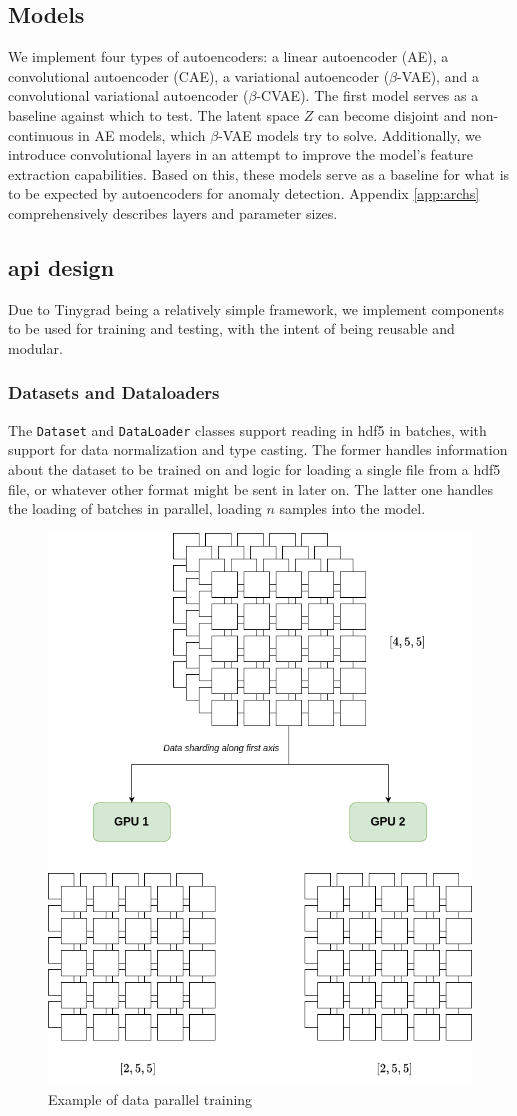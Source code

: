 \subsection{Models} 

We implement four types of autoencoders: a linear autoencoder (AE), a convolutional autoencoder (CAE), a variational autoencoder ($\beta$-VAE), and a convolutional variational autoencoder ($\beta$-CVAE). The first model serves as a baseline against which to test. The latent space $Z$ can become disjoint and non-continuous in AE models, which $\beta$-VAE models try to solve. Additionally, we introduce convolutional layers in an attempt to improve the model's feature extraction capabilities. Based on this, these models serve as a baseline for what is to be expected by autoencoders for anomaly detection. Appendix \ref{app:archs} comprehensively describes layers and parameter sizes. \\

\subsection{\acrshort{api} design}

Due to Tinygrad being a relatively simple framework, we implement components to be used for training and testing, with the intent of being reusable and modular.

\subsubsection{Datasets and Dataloaders}

The \texttt{Dataset} and \texttt{DataLoader} classes support reading in \acrshort{hdf5} in batches, with support for data normalization and type casting. The former handles information about the dataset to be trained on and logic for loading a single file from a \acrshort{hdf5} file, or whatever other format might be sent in later on. The latter one handles the loading of batches in parallel, loading $n$ samples into the model.

\begin{figure}[!h]
    \centering
    \includegraphics[width=0.5\linewidth]{figures/sharding.png}
    \caption{Example of data parallel training}
    \label{fig:dataparallel}
\end{figure}

